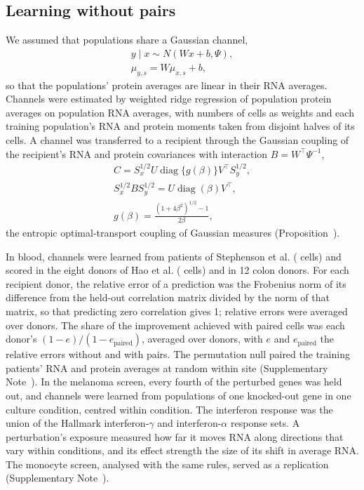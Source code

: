 \documentclass[pdflatex,sn-vancouver-num,iicol]{sn-jnl}
\begin{document}
\subsection{Learning without pairs}
We assumed that populations share a Gaussian channel,
\begin{equation}
 \begin{gathered}
 y\mid x\sim N(Wx+b,\Psi),\\
 \mu_{y,s}=W\mu_{x,s}+b,
 \end{gathered}
 \label{eq:channel}
\end{equation}
so that the populations' protein averages are linear in their RNA averages. Channels were estimated by weighted ridge regression\cite{hoerl1970} of population protein averages on population RNA averages, with numbers of cells as weights and each training population's RNA and protein moments taken from disjoint halves of its cells. A channel was transferred to a recipient through the Gaussian coupling of the recipient's RNA and protein covariances with interaction $B=W^\top\Psi^{-1}$,
\begin{equation}
 \begin{gathered}
 C=S_x^{1/2}U\operatorname{diag}\{g(\beta)\}V^\top S_y^{1/2},\\
 S_x^{1/2}BS_y^{1/2}=U\operatorname{diag}(\beta)V^\top,\\
 g(\beta)=\frac{(1+4\beta^2)^{1/2}-1}{2\beta},
 \end{gathered}
 \label{eq:closed}
\end{equation}
the entropic optimal-transport coupling of Gaussian measures\cite{janati2020,mallasto2022} (Proposition~).

In blood, channels were learned from \XsPatients{} patients of Stephenson et al. (\XsTrainCells{} cells) and scored in the eight donors of Hao et al. (\XsHaoCells{} cells) and in 12 colon donors\cite{mennillo2024}. For each recipient donor, the relative error of a prediction was the Frobenius norm of its difference from the held-out correlation matrix divided by the norm of that matrix, so that predicting zero correlation gives 1; relative errors were averaged over donors. The share of the improvement achieved with paired cells was each donor's $(1-e)/(1-e_{\mathrm{paired}})$, averaged over donors, with $e$ and $e_{\mathrm{paired}}$ the relative errors without and with pairs. The permutation null paired the training patients' RNA and protein averages at random within site (Supplementary Note~). In the melanoma screen, every fourth of the \PtTargets{} perturbed genes was held out, and channels were learned from \PtTrainPops{} populations of one knocked-out gene in one culture condition, centred within condition. The interferon response was the union of the Hallmark interferon-$\gamma$ and interferon-$\alpha$ response sets\cite{liberzon2015}. A perturbation's exposure measured how far it moves RNA along directions that vary within conditions, and its effect strength the size of its shift in average RNA. The monocyte screen, analysed with the same rules, served as a replication (Supplementary Note~).
\end{document}
